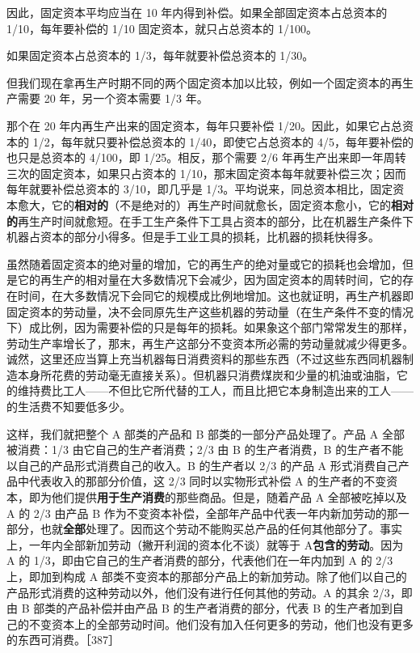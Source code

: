 因此，固定资本平均应当在 10 年内得到补偿。如果全部固定资本占总资本的 1/10，每年要补偿的 1/10 固定资本，就只占总资本的 1/100。

如果固定资本占总资本的 1/3，每年就要补偿总资本的 1/30。

但我们现在拿再生产时期不同的两个固定资本加以比较，例如一个固定资本的再生产需要 20 年，另一个资本需要 1/3 年。

那个在 20 年内再生产出来的固定资本，每年只要补偿 1/20。因此，如果它占总资本的 1/2，每年就只要补偿总资本的 1/40，即使它占总资本的 4/5，每年要补偿的也只是总资本的 4/100，即 1/25。相反，那个需要 2/6 年再生产出来即一年周转三次的固定资本，如果只占资本的 1/10，那末固定资本每年就要补偿三次；因而每年就要补偿总资本的 3/10，即几乎是 1/3。平均说来，同总资本相比，固定资本愈大，它的\textbf{相对的}（不是绝对的）再生产时间就愈长，固定资本愈小，它的\textbf{相对的}再生产时间就愈短。在手工生产条件下工具占资本的部分，比在机器生产条件下机器占资本的部分小得多。但是手工业工具的损耗，比机器的损耗快得多。

虽然随着固定资本的绝对量的增加，它的再生产的绝对量或它的损耗也会增加，但是它的再生产的相对量在大多数情况下会减少，因为固定资本的周转时间，它的存在时间，在大多数情况下会同它的规模成比例地增加。这也就证明，再生产机器即固定资本的劳动量，决不会同原先生产这些机器的劳动量（在生产条件不变的情况下）成比例，因为需要补偿的只是每年的损耗。如果象这个部门常常发生的那样，劳动生产率增长了，那末，再生产这部分不变资本所必需的劳动量就减少得更多。诚然，这里还应当算上充当机器每日消费资料的那些东西（不过这些东西同机器制造本身所花费的劳动毫无直接关系）。但机器只消费煤炭和少量的机油或油脂，它的维持费比工人——不但比它所代替的工人，而且比把它本身制造出来的工人——的生活费不知要低多少。


这样，我们就把整个 A 部类的产品和 B 部类的一部分产品处理了。产品 A 全部被消费：1/3 由它自己的生产者消费；2/3 由 B 的生产者消费，B 的生产者不能以自己的产品形式消费自己的收入。B 的生产者以 2/3 的产品 A 形式消费自己产品中代表收入的那部分价值，这 2/3 同时以实物形式补偿 A 的生产者的不变资本，即为他们提供\textbf{用于生产消费}的那些商品。但是，随着产品 A 全部被吃掉以及 A 的 2/3 由产品 B 作为不变资本补偿，全部年产品中代表一年内新加劳动的那一部分，也就\textbf{全部}处理了。因而这个劳动不能购买总产品的任何其他部分了。事实上，一年内全部新加劳动（撇开利润的资本化不谈）就等于 A\textbf{包含的劳动}。因为 A 的 1/3，即由它自己的生产者消费的部分，代表他们在一年内加到 A 的 2/3 上，即加到构成 A 部类不变资本的那部分产品上的新加劳动。除了他们以自己的产品形式消费的这种劳动以外，他们没有进行任何其他的劳动。A 的其余 2/3，即由 B 部类的产品补偿并由产品 B 的生产者消费的部分，代表 B 的生产者加到自己的不变资本上的全部劳动时间。他们没有加入任何更多的劳动，他们也没有更多的东西可消费。［387］

